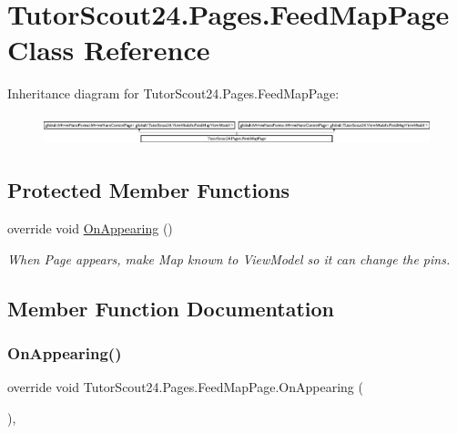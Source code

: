 \hypertarget{class_tutor_scout24_1_1_pages_1_1_feed_map_page}{}\section{Tutor\+Scout24.\+Pages.\+Feed\+Map\+Page Class Reference}
\label{class_tutor_scout24_1_1_pages_1_1_feed_map_page}
Inheritance diagram for Tutor\+Scout24.\+Pages.\+Feed\+Map\+Page\+:\begin{figure}[H]
\begin{center}
\leavevmode
\includegraphics[height=0.883281cm]{class_tutor_scout24_1_1_pages_1_1_feed_map_page}
\end{center}
\end{figure}
\subsection*{Protected Member Functions}
\begin{DoxyCompactItemize}
\item 
override void \mbox{\hyperlink{class_tutor_scout24_1_1_pages_1_1_feed_map_page_ac5b4003cbb16aaba7312dbcbf73392b5}{On\+Appearing}} ()
\begin{DoxyCompactList}\small\item\em When Page appears, make Map known to View\+Model so it can change the pins. \end{DoxyCompactList}\end{DoxyCompactItemize}


\subsection{Member Function Documentation}
\mbox{\label{class_tutor_scout24_1_1_pages_1_1_feed_map_page_ac5b4003cbb16aaba7312dbcbf73392b5}} 
\subsubsection{\texorpdfstring{On\+Appearing()}{OnAppearing()}}
{\footnotesize\ttfamily override void Tutor\+Scout24.\+Pages.\+Feed\+Map\+Page.\+On\+Appearing (\begin{DoxyParamCaption}{ }\end{DoxyParamCaption})\hspace{0.3cm}{\ttfamily [inline]}, {\ttfamily [protected]}}



